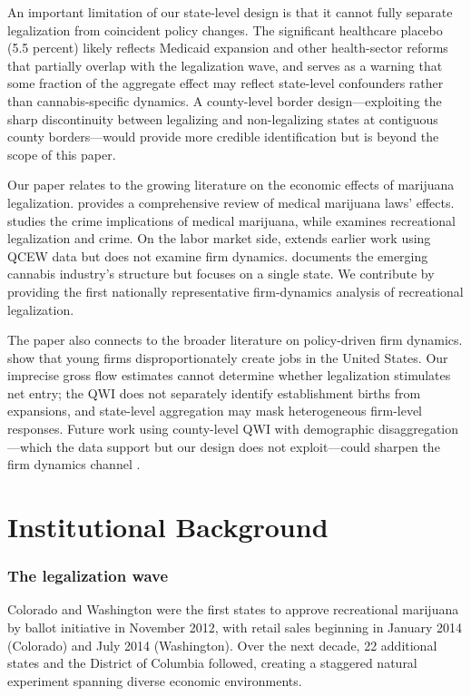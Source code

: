 \documentclass[12pt]{article}
\begin{document}
An important limitation of our state-level design is that it cannot fully separate legalization from coincident policy changes. The significant healthcare placebo (5.5 percent) likely reflects Medicaid expansion and other health-sector reforms that partially overlap with the legalization wave, and serves as a warning that some fraction of the aggregate effect may reflect state-level confounders rather than cannabis-specific dynamics. A county-level border design---exploiting the sharp discontinuity between legalizing and non-legalizing states at contiguous county borders---would provide more credible identification but is beyond the scope of this paper.

Our paper relates to the growing literature on the economic effects of marijuana legalization. \citet{pacula2017} provides a comprehensive review of medical marijuana laws' effects. \citet{gavrilova2019} studies the crime implications of medical marijuana, while \citet{hao2024} examines recreational legalization and crime. On the labor market side, \citet{nicholas2025} extends earlier work using QCEW data but does not examine firm dynamics. \citet{doremus2022} documents the emerging cannabis industry's structure but focuses on a single state. We contribute by providing the first nationally representative firm-dynamics analysis of recreational legalization.

The paper also connects to the broader literature on policy-driven firm dynamics. \citet{haltiwanger2013} show that young firms disproportionately create jobs in the United States. Our imprecise gross flow estimates cannot determine whether legalization stimulates net entry; the QWI does not separately identify establishment births from expansions, and state-level aggregation may mask heterogeneous firm-level responses. Future work using county-level QWI with demographic disaggregation---which the data support but our design does not exploit---could sharpen the firm dynamics channel \citep{dills2021, roth2023}.

\section{Institutional Background}

\subsubsection*{The legalization wave} Colorado and Washington were the first states to approve recreational marijuana by ballot initiative in November 2012, with retail sales beginning in January 2014 (Colorado) and July 2014 (Washington). Over the next decade, 22 additional states and the District of Columbia followed, creating a staggered natural experiment spanning diverse economic environments.
\end{document}
